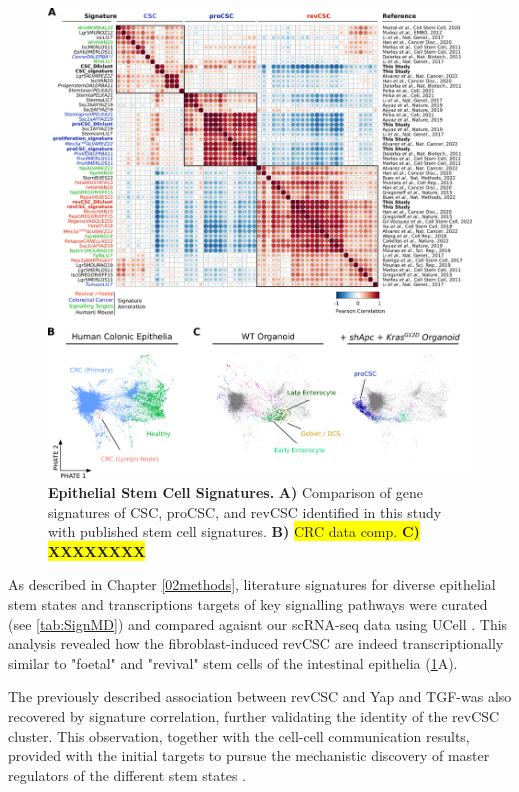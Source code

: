 \begin{figure}
    \centering
    \includegraphics{04seq/figs/4SEQ_StemSign.png}
    \caption{\textbf{Epithelial Stem Cell Signatures.} \textbf{A)} Comparison of gene signatures of CSC, proCSC, and revCSC identified in this study with published stem cell signatures. \textbf{B)} \colorbox{yellow}{CRC data comp. \textbf{C) XXXXXXXX }}}
    \label{fig:4sign}
\end{figure}

As described in Chapter \ref{02methods}, literature signatures for diverse epithelial stem states and transcriptions targets of key signalling pathways were curated (see \ref{tab:SignMD}) and compared agaisnt our scRNA-seq data using UCell \cite{andreatta_ucell_2021}. This analysis revealed how the fibroblast-induced revCSC are indeed transcriptionally similar to "foetal" \cite{mustata_identification_2013, yui_yaptaz-dependent_2018} and "revival" stem cells \cite{ayyaz_single-cell_2019} of the intestinal epithelia (\ref{fig:4sign}A). 

The previously described association between revCSC and Yap and TGF-\textbeta\hspace{0.1cm}was also recovered by signature correlation, further validating the identity of the revCSC cluster. This observation, together with the cell-cell communication results, provided with the initial targets to pursue the mechanistic discovery of master regulators of the different stem states \cite{cardoso_rodriguez_single-cell_2023}.

